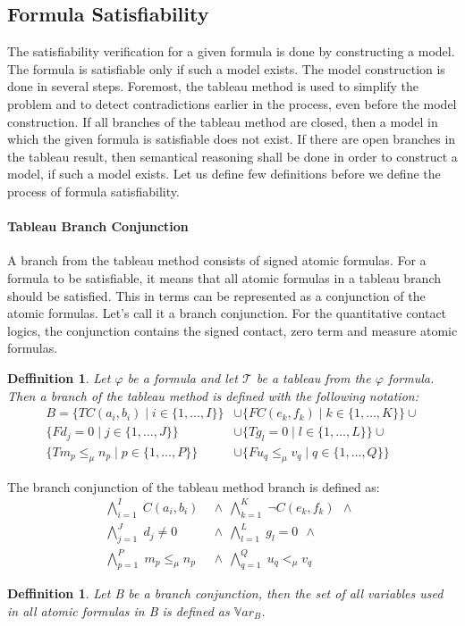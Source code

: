 \documentclass{article}
\newtheorem{defn}[theorem]{Deffinition}
\newcommand{\Var}{\mathbb{V}ar}
\newcommand{\BranchConjunction}{%
\begin{align*}
			\bigwedge_{i=1}^{I} \; C(a_i, b_i) \:\: & \wedge \:\: 
			\bigwedge_{k=1}^{K} \; \neg C(e_k, f_k) \:\: \wedge \:\: \\
			\bigwedge_{j=1}^{J} \; d_j \neq 0 \:\: & \wedge \:\:
			\bigwedge_{l=1}^{L} \; g_l = 0 \:\: \wedge \:\:\\
			\bigwedge_{p=1}^{P} \; m_p \le_\mu n_p \:\: &\wedge \:\:
			\bigwedge_{q=1}^{Q} \; u_q <_\mu v_q \:\:
\end{align*}%
}
\begin{document}
	\subsection{Formula Satisfiability} 
The satisfiability verification for a given formula is done by constructing a model. The formula is satisfiable only if such a model exists. The model construction is done in several steps. Foremost, the tableau method is used to simplify the problem and to detect contradictions earlier in the process, even before the model construction. If all branches of the tableau method are closed, then a model in which the given formula is satisfiable does not exist. If there are open branches in the tableau result, then semantical reasoning shall be done in order to construct a model, if such a model exists. Let us define few definitions before we define the process of formula satisfiability.

	\paragraph{Tableau Branch Conjunction}
		A branch from the tableau method consists of signed atomic formulas. For a formula to be satisfiable, it means that all atomic formulas in a tableau branch should be satisfied. This in terms can be represented as a conjunction of the atomic formulas. Let's call it a branch conjunction. For the quantitative contact logics, the conjunction contains the signed contact, zero term and measure atomic formulas.
	\begin{defn}
		Let $\varphi$ be a formula and let $\mathcal{T}$ be a tableau from the $\varphi$ formula. Then a branch of the tableau method is defined with the following notation:
		\begin{align*}
				B = \{T C(a_i, b_i) \mid i \in \{1, \ldots, I\} \} &\cup 
					\{F C(e_k, f_k) \mid k \in \{1, \ldots, K\} \} \cup \\
					\{F d_j = 0 \mid j \in \{1, \ldots, J\} \} &\cup 
					\{T g_l = 0 \mid l \in \{1, \ldots, L\} \} \cup \\
					\{T m_p \le_\mu n_p \mid p \in \{1, \ldots, P\} \} &\cup 
					\{F u_q \le_\mu v_q \mid q \in \{1, \ldots, Q\} \}
		\end{align*}
	\end{defn}
	The branch conjunction of the tableau method branch is defined as:
	\BranchConjunction

	\begin{defn}
		Let B be a branch conjunction, then the set of all variables used in all atomic formulas in B is defined as $\Var_B$.
	\end{defn}
\end{document}
